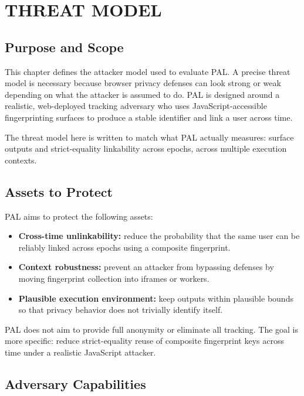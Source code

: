 \documentclass[11pt]{report}
\begin{document}
\chapter{THREAT MODEL}

\section{Purpose and Scope}

This chapter defines the attacker model used to evaluate PAL. A precise threat model is necessary because browser privacy defenses can look strong or weak depending on what the attacker is assumed to do. PAL is designed around a realistic, web-deployed tracking adversary who uses JavaScript-accessible fingerprinting surfaces to produce a stable identifier and link a user across time.

The threat model here is written to match what PAL actually measures: surface outputs and strict-equality linkability across epochs, across multiple execution contexts.

\section{Assets to Protect}

PAL aims to protect the following assets:

\begin{itemize}
    \item \textbf{Cross-time unlinkability:} reduce the probability that the same user can be reliably linked across epochs using a composite fingerprint.
    \item \textbf{Context robustness:} prevent an attacker from bypassing defenses by moving fingerprint collection into iframes or workers.
    \item \textbf{Plausible execution environment:} keep outputs within plausible bounds so that privacy behavior does not trivially identify itself.
\end{itemize}

PAL does not aim to provide full anonymity or eliminate all tracking. The goal is more specific: reduce strict-equality reuse of composite fingerprint keys across time under a realistic JavaScript attacker.

\section{Adversary Capabilities}
\end{document}
